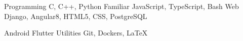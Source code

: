 

\begin{cvskills}

  \cvskill
    {Programming} %
    {C, C++, Python} %
  \cvskill
  	{Familiar}
  	{JavaScript, TypeScript, Bash}
  \cvskill
    {Web} %
    {Django, Angular8, HTML5, CSS, PostgreSQL} %
    
  \cvskill
  	{Android}
  	{Flutter}
  \cvskill
  	{Utilities}
  	{Git, Dockers, \LaTeX}

\end{cvskills}
